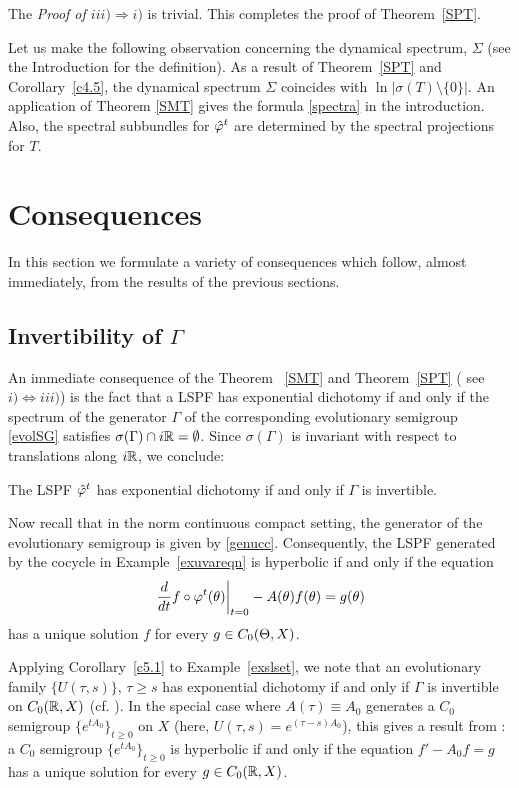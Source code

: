 The {\em Proof of $iii)\Rightarrow i)$} is
trivial.  This completes the proof of Theorem~\ref{SPT}.

  Let us make the following
observation concerning the dynamical spectrum, $\Sigma$
(see the Introduction for the definition).
 As a result of Theorem~\ref{SPT} and Corollary~\ref{c4.5},
the dynamical spectrum $\Sigma$ coincides with
$\ln|\sigma(T)\setminus\{0\}|$.  An application of Theorem \ref{SMT}
gives the formula \eqref{spectra} in the introduction.
Also, the  spectral subbundles for ${\hat{\varphi}}^t$ are determined by the
spectral projections for $T$.





\section{Consequences}
\setcounter{equation}{0}

In this section we formulate a
variety of consequences which follow, almost immediately, from the
results of the previous sections.

\subsection{Invertibility of $\Gamma$}

An immediate consequence of the Theorem~ \ref{SMT} and
Theorem~\ref{SPT} ( see $i)\Leftrightarrow iii)$) is the fact that a
LSPF has exponential dichotomy if and only if the spectrum of the
generator $\Gamma$ of the corresponding evolutionary semigroup
\eqref{evolSG} satisfies  $\sigma(\Gamma)\cap i{\Bbb{R}}=\emptyset$.
Since $\sigma(\Gamma)$ is invariant with respect to translations
along $i{\Bbb{R}}$, we conclude:

\begin{cor}  The LSPF ${\hat{\varphi}}^t$ has exponential
dichotomy if and only if $\Gamma$ is invertible.
\end{cor}

Now recall that in the norm continuous compact
setting, the generator of the evolutionary semigroup is given by
\eqref{genucc}.  Consequently, the LSPF generated by the cocycle
in Example~\ref{exuvareqn} is hyperbolic if and only if
the equation
\[\left.\dfrac{d}{dt}f\circ\varphi^t(\theta)\right|_{t=0}-A(\theta)f(\theta)=g(\theta)\]
has a unique solution $f$ for every $g\in C_0(\Theta,X)$.

Applying Corollary~\ref{c5.1} to  Example~\ref{exslset}, we
note that an evolutionary family $\{U(\tau,s)\}$, ${\tau\ge s}$
has exponential dichotomy if and only if $\Gamma$ is invertible
on $C_0({\Bbb{R}},X)$ (cf. \cite{LMS1,LMS2,LatRand}).  In the special case
where $A(\tau)\equiv A_0$ generates a $C_0$ semigroup
$\{e^{tA_0}\}_{t\ge0}$ on $X$
(here, $U(\tau,s)=e^{(\tau-s)A_0}$),
this gives a result from \cite{Pruss}: a $C_0$ semigroup
$\{e^{tA_0}\}_{t\ge0}$ is hyperbolic if and only if the equation
$f'-A_0f=g$ has a unique solution for every $g\in C_0({\Bbb{R}},X)$.

